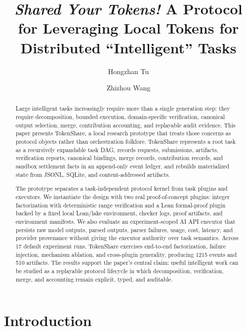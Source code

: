 \documentclass{article}
\title{{\textit{Shared Your Tokens!}  A Protocol for Leveraging Local Tokens  for  Distributed ``Intelligent'' Tasks}}
\author{Hongzhan Tu}
\author{Zhizhou Wang}
\theoremstyle{plain}
\begin{document}
\maketitle

\begin{abstract}
{\color{blue}
Large intelligent tasks increasingly require more than a single generation step: they require decomposition, bounded execution, domain-specific verification, canonical output selection, merge, contribution accounting, and replayable audit evidence. This paper presents TokenShare, a local research prototype that treats those concerns as protocol objects rather than orchestration folklore. TokenShare represents a root task as a recursively expandable task DAG, records requests, submissions, artifacts, verification reports, canonical bindings, merge records, contribution records, and sandbox settlement facts in an append-only event ledger, and rebuilds materialized state from JSONL, SQLite, and content-addressed artifacts.

The prototype separates a task-independent protocol kernel from task plugins and executors. We instantiate the design with two real proof-of-concept plugins: integer factorization with deterministic range verification and a Lean formal-proof plugin backed by a fixed local Lean/lake environment, checker logs, proof artifacts, and environment manifests. We also evaluate an experiment-scoped AI API executor that persists raw model outputs, parsed outputs, parser failures, usage, cost, latency, and provider provenance without giving the executor authority over task semantics. Across 17 default experiment runs, TokenShare exercises end-to-end factorization, failure injection, mechanism ablation, and cross-plugin generality, producing 1215 events and 510 artifacts. The results support the paper's central claim: useful intelligent work can be studied as a replayable protocol lifecycle in which decomposition, verification, merge, and accounting remain explicit, typed, and auditable.
}
\end{abstract}

\section{Introduction}
\end{document}
